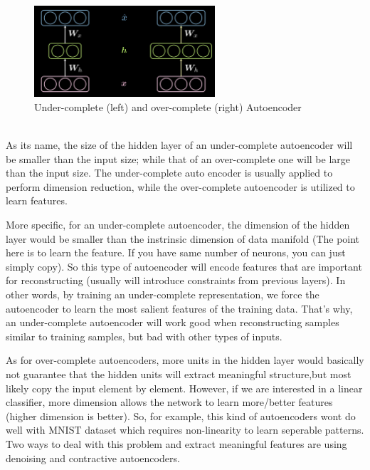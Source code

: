 \\
\begin{figure}[htb]
    \centering
    \includegraphics[width=0.6\textwidth]{labs/10/images/Under_(over)_complete_Autoencoder.png}
    \caption{Under-complete (left) and over-complete (right) Autoencoder}
    \label{fig:Under_(over)_complete_Autoencoder}
\end{figure}
\\
As its name, the size of the hidden layer of an under-complete autoencoder will be smaller than the input size; while that of an over-complete one will be large than the input size. The under-complete auto encoder is usually applied to perform dimension reduction, while the over-complete autoencoder is utilized to learn features.

More specific, for an under-complete autoencoder, the dimension of the hidden layer would be smaller than the instrinsic dimension of data manifold (The point here is to learn the feature. If you have same number of neurons, you can just simply copy). So this type of autoencoder will encode features that are important for reconstructing (usually will introduce constraints from previous layers). In other words, by training an under-complete representation, we force the autoencoder to learn the most salient features of the training data. That's why, an under-complete autoencoder will work good when reconstructing samples similar to training samples, but bad with other types of inputs.  

As for over-complete autoencoders, more units in the hidden layer would basically not guarantee that the hidden units will extract meaningful structure,but most likely copy the input element by element. However, if we are interested in a linear classifier, more dimension allows the network to learn more/better features (higher dimension is better). So, for example, this kind of autoencoders wont do well with MNIST dataset which requires non-linearity to learn seperable patterns. Two ways to deal with this problem and extract meaningful features are using denoising and contractive autoencoders.
\\
